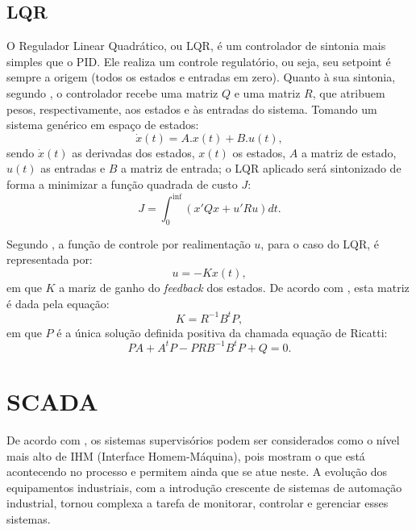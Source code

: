 \subsection{LQR}

O Regulador Linear Quadrático, ou LQR, é um controlador de sintonia mais simples que o PID. Ele realiza um controle regulatório, ou seja, seu setpoint é sempre a origem (todos os estados e entradas em zero). Quanto à sua sintonia, segundo , o controlador recebe uma matriz $Q$ e uma matriz $R$, que atribuem pesos, respectivamente, aos estados e às entradas do sistema. Tomando um sistema genérico em espaço de estados:
\begin{equation}
\dot{x}(t) = A.x(t) + B.u(t),
\end{equation}
sendo $\dot{x}(t)$ as derivadas dos estados, $x(t)$ os estados, $A$ a matriz de estado, $u(t)$ as entradas e $B$ a matriz de entrada; o LQR aplicado será sintonizado de forma a minimizar a função quadrada de custo $J$:
\begin{equation}
J = \int_{0}^{\inf}(x'Qx + u'Ru)dt.
\label{lqr_cost_func}
\end{equation}

Segundo , a função de controle por realimentação $u$, para o caso do LQR, é representada por:
\begin{equation}
u = -Kx(t),
\label{lqr_generic_control_func}
\end{equation}
em que $K$ a mariz de ganho do \emph{feedback} dos estados. De acordo com , esta matriz é dada pela equação:
\begin{equation}
K = R^{-1}B^tP,
\end{equation}
em que $P$ é a única solução definida positiva da chamada equação de Ricatti:
\begin{equation}
PA + A^tP - PRB^{-1}B^tP + Q = 0.
\end{equation}

\section{SCADA}

De acordo com , os sistemas supervisórios podem ser considerados como o nível mais alto de IHM (Interface Homem-Máquina), pois mostram o que está acontecendo no processo e permitem ainda que se atue neste. A evolução dos equipamentos industriais, com a introdução crescente de sistemas de automação industrial, tornou complexa a tarefa de monitorar, controlar e gerenciar esses sistemas. 

